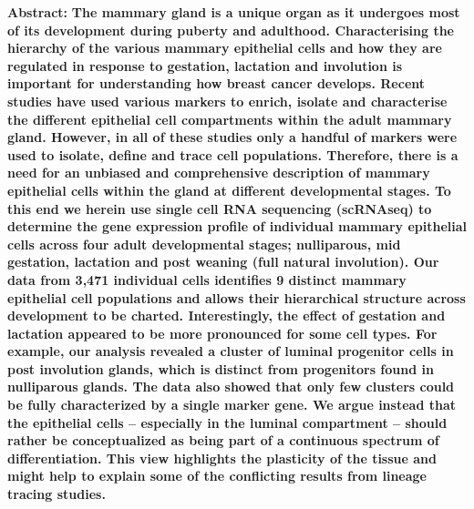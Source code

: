 \documentclass[titlepage, 12pt, oneside]{amsart}
\begin{document}
\textbf{Abstract:}
\textbf{The mammary gland is a unique organ as it undergoes most of its development during puberty and adulthood.
Characterising the hierarchy of the various mammary epithelial cells and how they are regulated in response to gestation, lactation and involution is important for understanding how breast cancer develops.
Recent studies have used various markers to enrich, isolate and characterise the different epithelial cell compartments within the adult mammary gland.
However, in all of these studies only a handful of markers were used to isolate, define and trace cell populations.
Therefore, there is a need for an unbiased and comprehensive description of mammary epithelial cells within the gland at different developmental stages.
To this end we herein use single cell RNA sequencing (scRNAseq) to determine the gene expression profile of individual mammary epithelial cells across four adult developmental stages; nulliparous, mid gestation, lactation and post weaning (full natural involution).
Our data from 3,471 individual cells identifies 9 distinct mammary epithelial cell populations and allows their hierarchical structure across development to be charted.
Interestingly, the effect of gestation and lactation appeared to be more pronounced for some cell types.
For example, our analysis revealed a cluster of luminal progenitor cells in post involution glands, which is distinct from progenitors found in nulliparous glands.
The data also showed that only few clusters could be fully characterized by a single marker gene.
We argue instead that the epithelial cells -- especially in the luminal compartment -- should rather be conceptualized as being part of a continuous spectrum of differentiation.
This view highlights the plasticity of the tissue and might help to explain some of the conflicting results from lineage tracing studies.}
\end{document}

